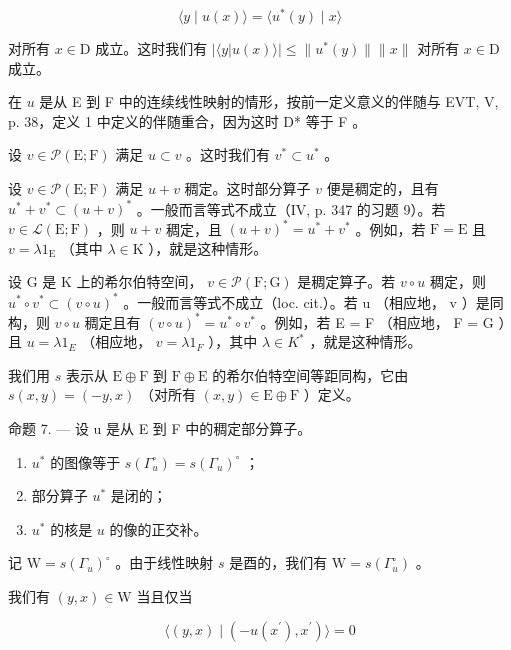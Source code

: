 \[
\langle y \mid u (x) \rangle = \langle u ^ {*} (y) \mid x \rangle\tag{1}
\]

对所有 \(x \in \mathrm{D}\) 成立。这时我们有 \(|\langle y | u(x) \rangle| \leqslant \| u^{*}(y) \| \| x \|\) 对所有 \(x \in \mathrm{D}\) 成立。

在 \(u\) 是从 E 到 F 中的连续线性映射的情形，按前一定义意义的伴随与 EVT, V, p. 38，定义 1 中定义的伴随重合，因为这时 D* 等于 F 。

设 \(v \in \mathcal{P}(\mathrm{E};\mathrm{F})\) 满足 \(u \subset v\) 。这时我们有 \(v^{*} \subset u^{*}\) 。

设 \(v \in \mathcal{P}(\mathrm{E};\mathrm{F})\) 满足 \(u + v\) 稠定。这时部分算子 \(v\) 便是稠定的，且有 \(u^{*} + v^{*} \subset (u + v)^{*}\) 。一般而言等式不成立（IV, p. 347 的习题 9）。若 \(v \in \mathcal{L}(\mathrm{E};\mathrm{F})\) ，则 \(u + v\) 稠定，且 \((u + v)^{*} = u^{*} + v^{*}\) 。例如，若 \(\mathrm{F} = \mathrm{E}\) 且 \(v = \lambda 1_{\mathrm{E}}\) （其中 \(\lambda \in \mathrm{K}\) ），就是这种情形。

设 G 是 K 上的希尔伯特空间， \(v \in \mathcal{P}(\mathrm{F};\mathrm{G})\) 是稠定算子。若 \(v \circ u\) 稠定，则 \(u^{*} \circ v^{*} \subset (v \circ u)^{*}\) 。一般而言等式不成立（loc. cit.）。若 u （相应地， v ）是同构，则 \(v \circ u\) 稠定且有 \((v \circ u)^{*} = u^{*} \circ v^{*}\) 。例如，若 E = F （相应地， F = G ）且 \(u = \lambda 1_{E}\) （相应地， \(v = \lambda 1_{F}\) ），其中 \(\lambda \in K^{*}\) ，就是这种情形。

我们用 \(s\) 表示从 \(\mathrm{E} \oplus \mathrm{F}\) 到 \(\mathrm{F} \oplus \mathrm{E}\) 的希尔伯特空间等距同构，它由 \(s(x, y) = (-y, x)\) （对所有 \((x, y) \in \mathrm{E} \oplus \mathrm{F}\) ）定义。

命题 7. --- 设 u 是从 E 到 F 中的稠定部分算子。

\begin{enumerate}
\def\labelenumi{\alph{enumi})}
\item
  \(u^{*}\) 的图像等于 \(s(\Gamma_{u}^{\circ}) = s(\Gamma_{u})^{\circ}\) ；
\item
  部分算子 \(u^{*}\) 是闭的；
\item
  \(u^{*}\) 的核是 \(u\) 的像的正交补。
\end{enumerate}

记 \(\mathrm{W} = s(\Gamma_u)^\circ\) 。由于线性映射 \(s\) 是酉的，我们有 \(\mathrm{W} = s(\Gamma_u^\circ)\) 。

我们有 \((y,x)\in \mathrm{W}\) 当且仅当

\[
\langle (y, x) \mid (- u (x ^ {\prime}), x ^ {\prime}) \rangle = 0
\]

